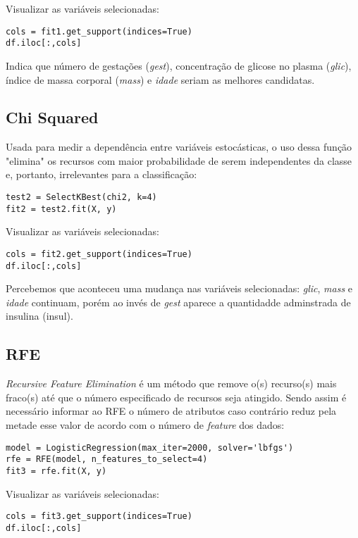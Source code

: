 Visualizar as variáveis selecionadas:
\begin{lstlisting}
cols = fit1.get_support(indices=True)
df.iloc[:,cols]
\end{lstlisting}

Indica que número de gestações (\textit{gest}), concentração de glicose no plasma (\textit{glic}), índice de massa corporal (\textit{mass}) e \textit{idade} seriam as melhores candidatas.

\subsection{Chi Squared}
Usada para medir a dependência entre variáveis estocásticas, o uso dessa função "elimina" os recursos com maior probabilidade de serem independentes da classe e, portanto, irrelevantes para a classificação:
\begin{lstlisting}
test2 = SelectKBest(chi2, k=4)
fit2 = test2.fit(X, y)
\end{lstlisting}

Visualizar as variáveis selecionadas:
\begin{lstlisting}
cols = fit2.get_support(indices=True)
df.iloc[:,cols]
\end{lstlisting}

Percebemos que aconteceu uma mudança nas variáveis selecionadas: \textit{glic}, \textit{mass} e \textit{idade} continuam, porém ao invés de \textit{gest} aparece a quantidadde adminstrada de insulina (insul).

\subsection{RFE}
\textit{Recursive Feature Elimination} é um método que remove o(s) recurso(s) mais fraco(s) até que o número especificado de recursos seja atingido. Sendo assim é necessário informar ao RFE o número de atributos caso contrário reduz pela metade esse valor de acordo com o número de \textit{feature} dos dados:
\begin{lstlisting}
model = LogisticRegression(max_iter=2000, solver='lbfgs')
rfe = RFE(model, n_features_to_select=4)
fit3 = rfe.fit(X, y)
\end{lstlisting}

Visualizar as variáveis selecionadas:
\begin{lstlisting}
cols = fit3.get_support(indices=True)
df.iloc[:,cols]
\end{lstlisting}

